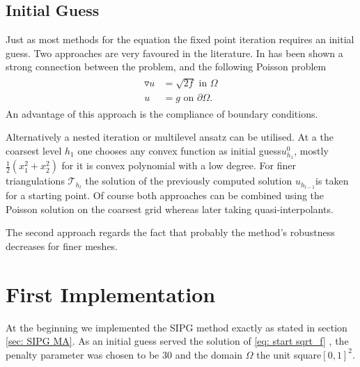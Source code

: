 \subsection{Initial Guess}\label{sec: initial guess}
Just as most methods for the \MA equation the fixed point iteration requires an initial guess. Two approaches are very favoured in the literature.
In \cite[Remark 2.1]{DG2006a} has been shown a strong connection between the \MA problem, and  the following Poisson problem
\begin{align}
	\begin{split}
	\triangledown u &= \sqrt{2f} \text{ in } \Omega \\ 
	u &= g \text{ on }\partial \Omega.
	\end{split}\label{eq: start sqrt_f}
\end{align}
An advantage of this approach is the compliance of boundary conditions.

Alternatively a nested iteration or multilevel ansatz can be utilised. At a the coarsest level $h_1$ one chooses any convex function as initial guess$u^0_{h_1}$, mostly $\frac 1 2 ({x_1^2} + {x_2^2}) $ for it is convex polynomial with a low degree. For finer triangulations $\mathcal{T}_{h_{l}}$ the solution of the previously computed solution $u_{h_{l-1}}$is taken for a starting point. Of course both approaches can be combined using the Poisson solution on the coarsest grid whereas later taking quasi-interpolants.

The second approach regards the fact that probably the method's robustness decreases for finer meshes.


\section{First Implementation}
At the beginning we implemented the SIPG method exactly as stated in section \ref{sec: SIPG MA}.
As an initial guess served the solution of \eqref{eq: start sqrt_f} , the penalty parameter was chosen to be 30 and the domain $\Omega$ the unit square$[0,1]^2$.

